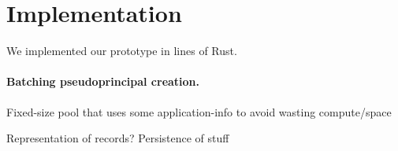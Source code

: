 \section{Implementation}

%
We implemented our \sys prototype in  lines of Rust.
%

\paragraph{Batching pseudoprincipal creation.}
%
Fixed-size pool that uses some application-info to avoid wasting compute/space

Representation of records? Persistence of stuff

